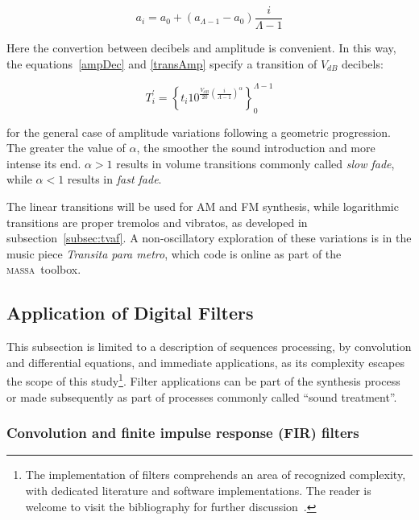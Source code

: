 \documentclass[
 aip,
 jmp,
 amsmath,amssymb,
 reprint,
]{revtex4-1}
\newcommand{\massa}{{\large \textsc{massa}}}
\begin{document}
\begin{equation}\label{seqAmpLin}
a_i=a_0 + (a_{\Lambda-1}-a_0)\frac{i}{\Lambda-1}
\end{equation}

Here the convertion between decibels and amplitude is convenient. In this way, the equations~\ref{ampDec} and \ref{transAmp} specify a transition of $V_{dB}$ decibels:

\begin{equation}\label{seqAmpDB}
T_i^{'}=\left\{ t_i 10^{\frac{V_{dB}}{20}\left( \frac{i}{\Lambda-1} \right)^\alpha} \right\}_0^{\Lambda-1}
\end{equation}

\noindent for the general case of amplitude variations following a geometric progression. The greater the value of $\alpha$, the smoother the sound introduction and more intense its end. $\alpha>1$ results in volume transitions commonly called \emph{slow fade}, while $\alpha<1$ results in \emph{fast fade}\cite{guillaume}.

The linear transitions will be used for AM and FM synthesis, while logarithmic transitions are proper tremolos and vibratos, as developed in subsection~\ref{subsec:tvaf}. A non-oscillatory exploration of these variations is in the music piece \emph{Transita para metro}, which code is online as part of the \massa\ toolbox\cite{MASSA}.


\subsection{Application of Digital Filters}\label{subsec:filtros}

This subsection is limited to a description of sequences processing, by convolution and differential equations, and immediate applications, as its complexity escapes the scope of this study\footnote{The implementation of filters comprehends an area of recognized complexity, with dedicated literature and software implementations. The reader is welcome to visit the bibliography for further discussion~\cite{Openheim,smith}.}. Filter applications can be part of the synthesis process or made subsequently as part of processes commonly called ``sound treatment''.
\subsubsection{Convolution and finite impulse response (FIR) filters}
\end{document}
